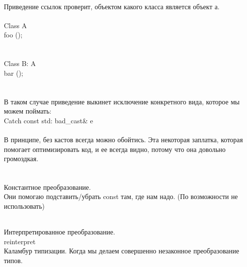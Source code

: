 \documentclass[a4paper,10pt]{article}
\begin{document}
\\Приведение ссылок проверит, объектом какого класса является объект а. 
\\

\\Class A {
\\foo ();
\\}
\\

\\Class B: A {
\\bar ();
\\}
\\

\\В таком случае приведение выкинет исключение конкретного вида, которое мы можем поймать:
\\Catch {const std: bad_cast& e}
\\

\\В принципе, без кастов всегда можно обойтись. Эта некоторая заплатка, которая помогает оптимизировать код, и ее всегда видно, потому что она довольно громоздкая.
\\
\\


\\Константное преобразование.
\\Они помогаю подставить/убрать const там, где нам надо. (По возможности не использовать)



\\Интерпретированное преобразование.
\\reinterpret
\\Каламбур типизации. Когда мы делаем совершенно незаконное преобразование типов. 
\end{document}
